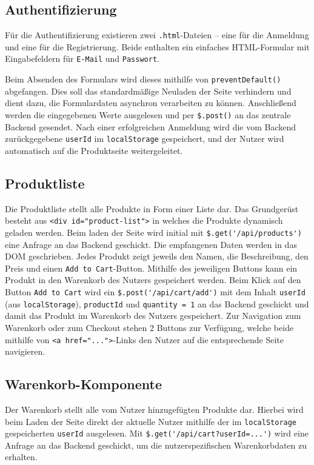 \documentclass[oneside]{ausarbeitung}
\begin{document}
\subsection{Authentifizierung}

Für die Authentifizierung existieren zwei \texttt{.html}-Dateien – eine für die Anmeldung und eine für die Registrierung. Beide enthalten ein einfaches HTML-Formular mit Eingabefeldern für \texttt{E-Mail} und \texttt{Passwort}.

Beim Absenden des Formulars wird dieses mithilfe von \texttt{preventDefault()} abgefangen. Dies soll das standardmäßige Neuladen der Seite verhindern und dient dazu, die Formulardaten asynchron verarbeiten zu können. Anschließend werden die eingegebenen Werte ausgelesen und per \verb|$.post()| an das zentrale Backend gesendet. Nach einer erfolgreichen Anmeldung wird die vom Backend zurückgegebene \texttt{userId} im \texttt{localStorage} gespeichert, und der Nutzer wird automatisch auf die Produktseite weitergeleitet.

\subsection{Produktliste}

Die Produktliste stellt alle Produkte in Form einer Liste dar. Das Grundgerüst besteht aus \texttt{<div id="product-list">} in welches die Produkte dynamisch geladen werden. Beim laden der Seite wird initial mit \verb|$.get('/api/products')| eine Anfrage an das Backend geschickt. Die empfangenen Daten werden in das DOM geschrieben. Jedes Produkt zeigt jeweils den Namen, die Beschreibung, den Preis und einen \texttt{Add to Cart}-Button. 
Mithilfe des jeweiligen Buttons kann ein Produkt in den Warenkorb des Nutzers gespeichert werden. Beim Klick auf den Button \texttt{Add to Cart} wird ein \verb|$.post('/api/cart/add')| mit dem Inhalt \texttt{userId} (aus \texttt{localStorage}), \texttt{productId} und \texttt{quantity = 1} an das Backend geschickt und damit das Produkt im Warenkorb des Nutzers gespeichert.
Zur Navigation zum Warenkorb oder zum Checkout stehen 2 Buttons zur Verfügung, welche beide mithilfe von \texttt{<a href="...">}-Links den Nutzer auf die entsprechende Seite navigieren. 

\subsection{Warenkorb-Komponente}

Der Warenkorb stellt alle vom Nutzer hinzugefügten Produkte dar. Hierbei wird beim Laden der Seite direkt der aktuelle Nutzer mithilfe der im \texttt{localStorage} gespeicherten \texttt{userId} ausgelesen. Mit \verb|$.get('/api/cart?userId=...')| wird eine Anfrage an das Backend geschickt, um die nutzerspezifischen Warenkorbdaten zu erhalten.
\end{document}
